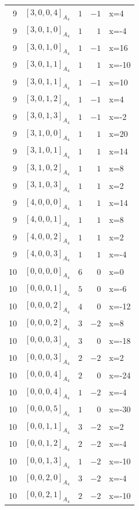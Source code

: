\documentclass[11pt]{article}
\newcommand{\Dynkin}[1]{#1}
\begin{document}
\begin{longtable}{r l r r l}
9 & $\Dynkin{[3,0,0,4]_{A_4}}$ & $1$ & $-1$ & x=4\\
9 & $\Dynkin{[3,0,1,0]_{A_4}}$ & $1$ & $1$ & x=-4\\
9 & $\Dynkin{[3,0,1,0]_{A_4}}$ & $1$ & $-1$ & x=16\\
9 & $\Dynkin{[3,0,1,1]_{A_4}}$ & $1$ & $1$ & x=-10\\
9 & $\Dynkin{[3,0,1,1]_{A_4}}$ & $1$ & $-1$ & x=10\\
9 & $\Dynkin{[3,0,1,2]_{A_4}}$ & $1$ & $-1$ & x=4\\
9 & $\Dynkin{[3,0,1,3]_{A_4}}$ & $1$ & $-1$ & x=-2\\
9 & $\Dynkin{[3,1,0,0]_{A_4}}$ & $1$ & $1$ & x=20\\
9 & $\Dynkin{[3,1,0,1]_{A_4}}$ & $1$ & $1$ & x=14\\
9 & $\Dynkin{[3,1,0,2]_{A_4}}$ & $1$ & $1$ & x=8\\
9 & $\Dynkin{[3,1,0,3]_{A_4}}$ & $1$ & $1$ & x=2\\
9 & $\Dynkin{[4,0,0,0]_{A_4}}$ & $1$ & $1$ & x=14\\
9 & $\Dynkin{[4,0,0,1]_{A_4}}$ & $1$ & $1$ & x=8\\
9 & $\Dynkin{[4,0,0,2]_{A_4}}$ & $1$ & $1$ & x=2\\
9 & $\Dynkin{[4,0,0,3]_{A_4}}$ & $1$ & $1$ & x=-4\\
10 & $\Dynkin{[0,0,0,0]_{A_4}}$ & $6$ & $0$ & x=0\\
10 & $\Dynkin{[0,0,0,1]_{A_4}}$ & $5$ & $0$ & x=-6\\
10 & $\Dynkin{[0,0,0,2]_{A_4}}$ & $4$ & $0$ & x=-12\\
10 & $\Dynkin{[0,0,0,2]_{A_4}}$ & $3$ & $-2$ & x=8\\
10 & $\Dynkin{[0,0,0,3]_{A_4}}$ & $3$ & $0$ & x=-18\\
10 & $\Dynkin{[0,0,0,3]_{A_4}}$ & $2$ & $-2$ & x=2\\
10 & $\Dynkin{[0,0,0,4]_{A_4}}$ & $2$ & $0$ & x=-24\\
10 & $\Dynkin{[0,0,0,4]_{A_4}}$ & $1$ & $-2$ & x=-4\\
10 & $\Dynkin{[0,0,0,5]_{A_4}}$ & $1$ & $0$ & x=-30\\
10 & $\Dynkin{[0,0,1,1]_{A_4}}$ & $3$ & $-2$ & x=2\\
10 & $\Dynkin{[0,0,1,2]_{A_4}}$ & $2$ & $-2$ & x=-4\\
10 & $\Dynkin{[0,0,1,3]_{A_4}}$ & $1$ & $-2$ & x=-10\\
10 & $\Dynkin{[0,0,2,0]_{A_4}}$ & $3$ & $-2$ & x=-4\\
10 & $\Dynkin{[0,0,2,1]_{A_4}}$ & $2$ & $-2$ & x=-10\\

\end{longtable}
\end{document}
